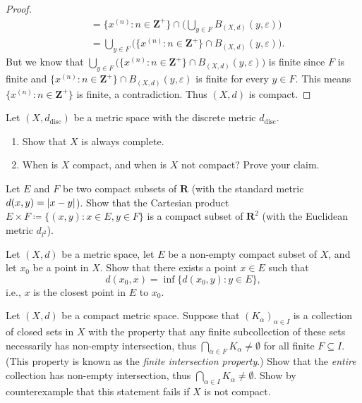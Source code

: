 \begin{proof}
\begin{align*}
                                         & = \{x^{(n)} : n \in \mathbf{Z}^+\} \cap \bigg(\bigcup_{y \in F} B_{(X, d)}(y, \varepsilon)\bigg) \\
                                         & = \bigcup_{y \in F} \big(\{x^{(n)} : n \in \mathbf{Z}^+\} \cap B_{(X, d)}(y, \varepsilon)\big).
    \end{align*}
    But we know that \(\bigcup_{y \in F} \big(\{x^{(n)} : n \in \mathbf{Z}^+\} \cap B_{(X, d)}(y, \varepsilon)\big)\) is finite since \(F\) is finite and \(\{x^{(n)} : n \in \mathbf{Z}^+\} \cap B_{(X, d)}(y, \varepsilon)\) is finite for every \(y \in F\).
    This means \(\{x^{(n)} : n \in \mathbf{Z}^+\}\) is finite, a contradiction.
    Thus \((X, d)\) is compact.
\end{proof}

\begin{exercise}\label{ex 1.5.12}
    Let \((X, d_{\text{disc}})\) be a metric space with the discrete metric \(d_{\text{disc}}\).
    \begin{enumerate}
        \item Show that \(X\) is always complete.
        \item When is \(X\) compact, and when is \(X\) not compact?
              Prove your claim.
    \end{enumerate}
\end{exercise}

\begin{exercise}\label{ex 1.5.13}
    Let \(E\) and \(F\) be two compact subsets of \(\mathbf{R}\) (with the standard metric \(d(x, y) = \abs*{x - y}\)).
    Show that the Cartesian product \(E \times F \coloneqq \{(x, y) : x \in E, y \in F\}\) is a compact subset of \(\mathbf{R}^2\) (with the Euclidean metric \(d_{l^2}\)).
\end{exercise}

\begin{exercise}\label{ex 1.5.14}
    Let \((X, d)\) be a metric space, let \(E\) be a non-empty compact subset of \(X\), and let \(x_0\) be a point in \(X\).
    Show that there exists a point \(x \in E\) such that
    \[
        d(x_0, x) = \inf\{d(x_0, y) : y \in E\},
    \]
    i.e., \(x\) is the closest point in \(E\) to \(x_0\).
\end{exercise}

\begin{exercise}\label{ex 1.5.15}
    Let \((X, d)\) be a compact metric space.
    Suppose that \((K_{\alpha})_{\alpha \in I}\) is a collection of closed sets in \(X\) with the property that any finite subcollection of these sets necessarily has non-empty intersection, thus \(\bigcap_{\alpha \in F} K_{\alpha} \neq \emptyset\) for all finite \(F \subseteq I\).
    (This property is known as the \emph{finite intersection property}.)
    Show that the \emph{entire} collection has non-empty intersection, thus \(\bigcap_{\alpha \in I} K_{\alpha} \neq \emptyset\).
    Show by counterexample that this statement fails if \(X\) is not compact.
\end{exercise}